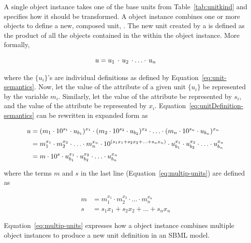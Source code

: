 A single \Unit object instance takes one of the base units from
Table~\ref{tab:unitkind} and specifies how it should be
transformed.  A \UnitDefinition object instance combines one or
more \Unit objects to define a new, composed unit, \udef.  The new
unit \udef created by a \UnitDefinition is defined as the product
of all the \Unit objects contained in the \ListOfUnits within the
\UnitDefinition object instance.  More formally, 
\begin{linenomath}
\begin{equation}
  u = u_1 \, \cdot \, u_2 \, \cdot \ldots \cdot \, u_n 
\label{eq:unitDefinition-semantics}
\end{equation}
\end{linenomath}
where the $\{u_i\}$'s are individual \Unit definitions as defined
by Equation~\ref{eq:unit-semantics}.  Now, let the value of the
 attribute of a given unit $\{u_i\}$ be
represented by the variable $m_i$.  Similarly, let the value of
the  attribute be represented by $s_i$, and the value
of the  attribute be represented by $x_i$.
Equation~\ref{eq:unitDefinition-semantics} can be rewritten in
expanded form as
\begin{linenomath}
\begin{align}
  u &= (m_1 \cdot 10^{s_1} \cdot u_{b_1})^{x_1} \cdot
       (m_2 \cdot 10^{s_2} \cdot u_{b_2})^{x_2} \cdot \ldots \cdot (m_n \cdot
       10^{s_n} \cdot u_{b_n})^{x_n} \notag \\[2pt]
    &= m_1^{x_1} \cdot m_2^{x_2} \cdot \ldots \cdot m_n^{x_n}
       \cdot 10^{(s_1 x_1 + s_2 x_2 + \ldots + s_n x_n)}
       \cdot u_{b_1}^{x_1} \cdot u_{b_2}^{x_2} \cdot \ldots \cdot u_{b_n}^{x_n} \notag \\[2pt]
    &= m \cdot 10^{s} \cdot u_{b_1}^{x_1} \cdot u_{b_2}^{x_2} \cdot \ldots \cdot u_{b_n}^{x_n}
\label{eq:multip-units}
\end{align}
\end{linenomath}
where the terms $m$ and $s$ in the last line
(Equation~\ref{eq:multip-units}) are defined as
\begin{linenomath}
\begin{align*}
  m &= m_1^{x_1} \cdot m_2^{x_2} \cdot \ldots \cdot m_n^{x_n} \\
  s &= s_1 x_1 + s_2 x_2 + \ldots + s_n x_n
\end{align*}
\end{linenomath}
Equation~\ref{eq:multip-units} expresses how a \UnitDefinition
object instance combines multiple \Unit object instances to
produce a new unit definition in an SBML model.


